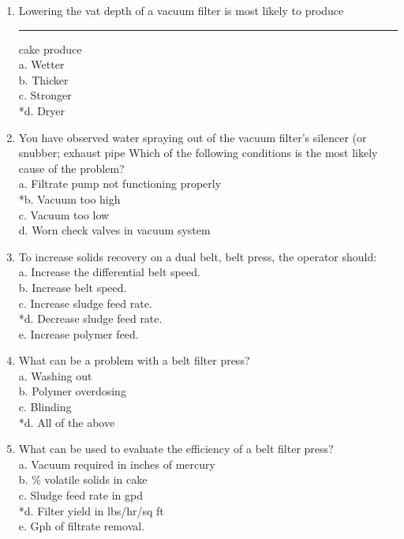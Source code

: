 \documentclass{article}
\begin{document}
\begin{enumerate}
\item  Lowering the vat depth of a vacuum filter is most likely to produce \rule{1.5cm}{0.3mm} cake produce \\

a. Wetter \\
b. Thicker \\
c. Stronger \\
*d. Dryer \\

\item  You have observed water spraying out of the vacuum filter's silencer (or snubber; exhaust pipe Which of the following conditions is the most likely cause of the problem? \\

a. Filtrate pump not functioning properly \\
*b. Vacuum too high \\
c. Vacuum too low \\
d. Worn check valves in vacuum system \\


\item  To increase solids recovery on a dual belt, belt press, the operator should: \\

a. Increase the differential belt speed. \\
b. Increase belt speed. \\
c. Increase sludge feed rate. \\
*d. Decrease sludge feed rate. \\
e. Increase polymer feed. \\

\item  What can be a problem with a belt filter press? \\

a. Washing out \\
b. Polymer overdosing \\
c. Blinding \\
*d. All of the above \\

\item  What can be used to evaluate the efficiency of a belt filter press? \\

a. Vacuum required in inches of mercury \\
b. \% volatile solids in cake \\
c. Sludge feed rate in gpd \\
*d. Filter yield in lbs/hr/sq ft \\
e. Gph of filtrate removal. \\


\end{enumerate}
\end{document}
